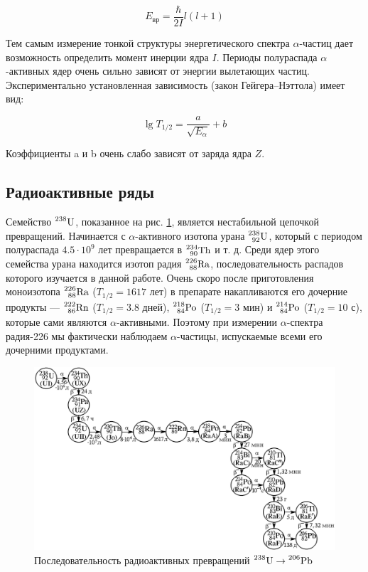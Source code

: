 \documentclass[a4paper,12pt]{article}
\begin{document}
\begin{equation}\label{eq:3}
    E_\text{вр} = \frac{\hbar}{2I} l (l + 1)
\end{equation}


Тем самым измерение тонкой структуры энергетического спектра $\alpha$-частиц дает возможность определить момент инерции ядра $I$. Периоды полураспада $\alpha$-активных ядер очень сильно зависят от энергии вылетающих частиц. Экспериментально установленная зависимость (закон Гейгера–Нэттола) имеет вид:

\begin{equation}\label{eq:4}
    \lg T_{1/2} = \frac{a}{\sqrt{E_\alpha}} + b
\end{equation}


Коэффициенты a и b очень слабо зависят от заряда ядра $Z$.


\subsection*{Радиоактивные ряды}

Семейство $\prescript{238}{}{\text{U}}$, показанное на рис. \ref{pic:chain}, является нестабильной цепочкой превращений. Начинается с $\alpha$-активного изотопа урана $\prescript{238}{92}{\text{U}}$, который с периодом полураспада $4.5 \cdot 10^9$ лет превращается в $\prescript{234}{90}{\text{Th}}$ и т. д. Среди ядер этого семейства урана находится изотоп радия $\prescript{226}{88}{\text{Ra}}$, последовательность распадов которого изучается в данной работе. Очень скоро после приготовления моноизотопа $\prescript{226}{88}{\text{Ra}}$ ($T_{1/2} = 1617$ лет) в препарате накапливаются его дочерние продукты — $\prescript{222}{86}{\text{Rn}}$ ($T_{1/2} = 3.8$ дней), $\prescript{218}{84}{\text{Po}}$ ($T_{1/2} = 3$ мин) и $\prescript{214}{84}{\text{Po}}$ ($T_{1/2} = 10$ с), которые сами являются $\alpha$-активными. Поэтому при измерении $\alpha$-спектра радия-226 мы фактически наблюдаем $\alpha$-частицы, испускаемые всеми его дочерними продуктами.


\FloatBarrier
\begin{figure}[h]
    \begin{center}
        \includegraphics[width = 1\textwidth]{pics/chain.png}
        \caption{Последовательность радиоактивных превращений $\prescript{238}{}{\text{U}} \to \prescript{206}{}{\text{Pb}}$}
    \label{pic:chain}
    \end{center}
\end{figure}
\FloatBarrier
\end{document}
